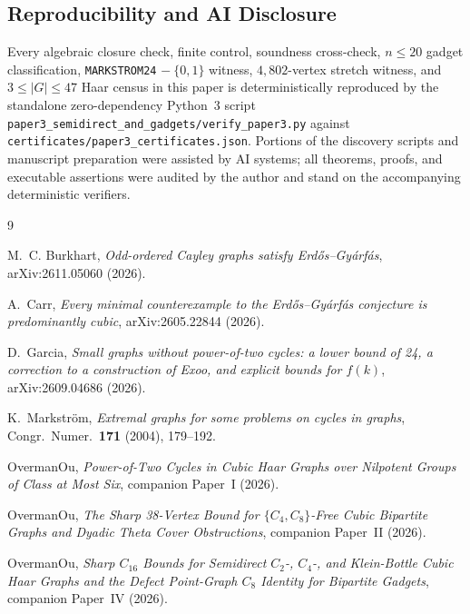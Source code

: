 \documentclass[11pt]{amsart}
\theoremstyle{definition}
\theoremstyle{remark}
\begin{document}
\subsection*{Reproducibility and AI Disclosure}
Every algebraic closure check, finite control, soundness cross-check, $n \le 20$ gadget classification, \texttt{MARKSTROM24} $-\ \{0,1\}$ witness, $4{,}802$-vertex stretch witness, and $3 \le |G| \le 47$ Haar census in this paper is deterministically reproduced by the standalone zero-dependency Python~3 script \texttt{paper3\_semidirect\_and\_gadgets/verify\_paper3.py} against \texttt{certificates/paper3\_certificates.json}. Portions of the discovery scripts and manuscript preparation were assisted by AI systems; all theorems, proofs, and executable assertions were audited by the author and stand on the accompanying deterministic verifiers.

\begin{thebibliography}{9}

M.~C. Burkhart, \emph{Odd-ordered Cayley graphs satisfy Erd\H{o}s--Gy\'arf\'as}, arXiv:2611.05060 (2026).

A.~Carr, \emph{Every minimal counterexample to the Erd\H{o}s--Gy\'arf\'as conjecture is predominantly cubic}, arXiv:2605.22844 (2026).

D.~Garcia, \emph{Small graphs without power-of-two cycles: a lower bound of 24, a correction to a construction of Exoo, and explicit bounds for $f(k)$}, arXiv:2609.04686 (2026).

K.~Markstr\"om, \emph{Extremal graphs for some problems on cycles in graphs}, Congr.\ Numer.\ \textbf{171} (2004), 179--192.

OvermanOu, \emph{Power-of-Two Cycles in Cubic Haar Graphs over Nilpotent Groups of Class at Most Six}, companion Paper~I (2026).

OvermanOu, \emph{The Sharp 38-Vertex Bound for $\{C_4, C_8\}$-Free Cubic Bipartite Graphs and Dyadic Theta Cover Obstructions}, companion Paper~II (2026).

OvermanOu, \emph{Sharp $C_{16}$ Bounds for Semidirect $C_2$-, $C_4$-, and Klein-Bottle Cubic Haar Graphs and the Defect Point-Graph $C_8$ Identity for Bipartite Gadgets}, companion Paper~IV (2026).

\end{thebibliography}
\end{document}
